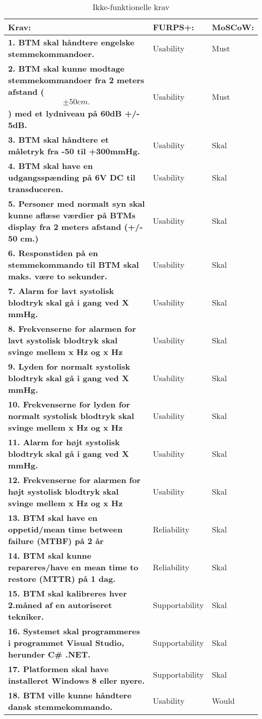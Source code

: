 \begin{table} [htbp]
\centering
\begin{tabular}{|p{10cm}|l|l|}
\hline
\textbf{Krav:} & \textbf{FURPS+:} & \textbf{MoSCoW:} \\ \hline
\textbf{1. BTM skal håndtere engelske stemmekommandoer. } & Usability & Must \\ \hline
\textbf{2. BTM skal kunne modtage stemmekommandoer fra 2 meters afstand (\begin{align}
\pm 50 cm.
\end{align})  med et lydniveau på 60dB +/- 5dB.} & Usability & Must \\ \hline
\textbf{3. BTM skal håndtere et måletryk fra -50 til +300mmHg. }  & Usability & Skal \\ \hline 
\textbf{4. BTM skal have en udgangsspænding på 6V DC til transduceren.} & Usability & Skal \\ \hline
\textbf{5. Personer med normalt syn skal kunne aflæse værdier på BTMs display fra 2 meters afstand (+/- 50 cm.) } & Usability & Skal \\ \hline
\textbf{6. Responstiden på en stemmekommando til BTM skal maks. være to sekunder.} & Usability & Skal \\ \hline
\textbf{7. Alarm for lavt systolisk blodtryk skal gå i gang ved X mmHg.} & Usability & Skal \\ \hline
\textbf{8. Frekvenserne for alarmen for lavt systolisk blodtryk skal svinge mellem x Hz og x Hz} & Usability & Skal \\ \hline
\textbf{9. Lyden for normalt systolisk blodtryk skal gå i gang ved X mmHg.} & Usability & Skal \\ \hline
\textbf{10. Frekvenserne for lyden for normalt systolisk blodtryk skal svinge mellem x Hz og x Hz} & Usability & Skal \\ \hline
\textbf{11. Alarm for højt systolisk blodtryk skal gå i gang ved X mmHg.} & Usability & Skal \\ \hline
\textbf{12. Frekvenserne for alarmen for højt systolisk blodtryk skal svinge mellem x Hz og x Hz} & Usability & Skal \\ \hline
\textbf{13. BTM skal have en oppetid/mean time between failure (MTBF) på  2 år } & Reliability & Skal \\ \hline
\textbf{14. BTM skal kunne repareres/have en mean time to restore (MTTR) på 1 dag. } & Reliability & Skal \\ \hline
\textbf{15. BTM skal kalibreres hver 2.måned af en autoriseret tekniker. } & Supportability & Skal \\ \hline
\textbf{16. Systemet skal programmeres i programmet Visual Studio, herunder C\# .NET.} & Supportability & Skal \\ \hline
\textbf{17. Platformen skal have installeret Windows 8 eller nyere.} & Supportability & Skal \\ \hline
\textbf{18. BTM ville kunne håndtere dansk stemmekommando.} & Usability & Would \\ \hline
\end{tabular}
\caption{Ikke-funktionelle krav}
\label{tb:ikkefunkkrav} 
\end{table}

